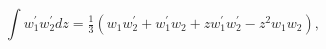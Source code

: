 \[\int w^{\prime}_{1}w^{\prime}_{2}dz=\tfrac{1}{3}(w_{1}w^{\prime}_{2}+w^{\prime%
}_{1}w_{2}+zw^{\prime}_{1}w^{\prime}_{2}-z^{2}w_{1}w_{2}),\]